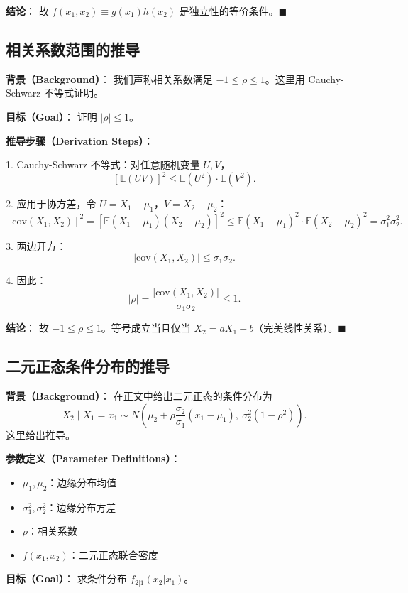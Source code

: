 \textbf{结论}：
故 $f(x_1, x_2) \equiv g(x_1) h(x_2)$ 是独立性的等价条件。$\blacksquare$

\subsection{相关系数范围的推导}\label{sec:derivation-correlation-bounds}

\textbf{背景（Background）}：
我们声称相关系数满足 $-1 \leq \rho \leq 1$。这里用 Cauchy-Schwarz 不等式证明。

\textbf{目标（Goal）}：
证明 $|\rho| \leq 1$。

\textbf{推导步骤（Derivation Steps）}：

1. Cauchy-Schwarz 不等式：对任意随机变量 $U, V$，
\[
[\mathbb{E}(UV)]^2 \leq \mathbb{E}(U^2) \cdot \mathbb{E}(V^2).
\]

2. 应用于协方差，令 $U = X_1 - \mu_1$，$V = X_2 - \mu_2$：
\[
[\text{cov}(X_1, X_2)]^2 = [\mathbb{E}(X_1 - \mu_1)(X_2 - \mu_2)]^2 \leq \mathbb{E}(X_1 - \mu_1)^2 \cdot \mathbb{E}(X_2 - \mu_2)^2 = \sigma_1^2 \sigma_2^2.
\]

3. 两边开方：
\[
|\text{cov}(X_1, X_2)| \leq \sigma_1 \sigma_2.
\]

4. 因此：
\[
|\rho| = \frac{|\text{cov}(X_1, X_2)|}{\sigma_1 \sigma_2} \leq 1.
\]

\textbf{结论}：
故 $-1 \leq \rho \leq 1$。等号成立当且仅当 $X_2 = a X_1 + b$（完美线性关系）。$\blacksquare$

\subsection{二元正态条件分布的推导}\label{sec:derivation-bivariate-normal-conditional}

\textbf{背景（Background）}：
在正文中给出二元正态的条件分布为
\[
X_2 \mid X_1 = x_1 \sim N\left(\mu_2 + \rho\frac{\sigma_2}{\sigma_1}(x_1 - \mu_1), \ \sigma_2^2(1-\rho^2)\right).
\]
这里给出推导。

\textbf{参数定义（Parameter Definitions）}：
\begin{itemize}
\item $\mu_1, \mu_2$：边缘分布均值
\item $\sigma_1^2, \sigma_2^2$：边缘分布方差
\item $\rho$：相关系数
\item $f(x_1, x_2)$：二元正态联合密度
\end{itemize}

\textbf{目标（Goal）}：
求条件分布 $f_{2|1}(x_2|x_1)$。

